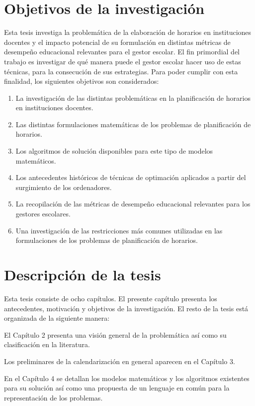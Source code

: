 \documentclass[draft,12pt,headsepline,footsepline,paper=letter]{scrreprt}
\begin{document}
\section{Objetivos de la investigación}

Esta tesis investiga la problemática de la elaboración de horarios en instituciones docentes y el impacto potencial de su formulación en distintas métricas de desempeño educacional relevantes para el gestor escolar.
El fin primordial del trabajo es investigar de qué manera puede el gestor escolar hacer uso de estas técnicas, para la consecución de sus estrategias.
Para poder cumplir con esta finalidad, los siguientes objetivos son considerados:
\begin{enumerate}[1]
\item La investigación de las distintas problemáticas en la planificación de horarios en instituciones docentes.
\item Las distintas formulaciones matemáticas de los problemas de planificación de horarios.
\item Los algoritmos de solución disponibles para este tipo de modelos matemáticos.
\item Los antecedentes históricos de técnicas de optimación aplicados a partir del surgimiento de los ordenadores.
\item La recopilación de las métricas de desempeño educacional relevantes para los gestores escolares.
\item Una investigación de las restricciones más comunes utilizadas en las formulaciones de los problemas de planificación de horarios.
\end{enumerate}

\section{Descripción de la tesis}

Esta tesis consiste de ocho capítulos. El presente capítulo presenta los antecedentes, motivación y objetivos de la investigación. El resto de la tesis está organizada de la siguiente manera:

El Capítulo 2 presenta una visión general de la problemática así como su clasificación en la literatura.

Los preliminares de la calendarización en general aparecen en el Capítulo 3.

En el Capítulo 4 se detallan los modelos matemáticos y los algoritmos existentes para su solución así como una propuesta de un lenguaje en común para la representación de los problemas.
\end{document}
